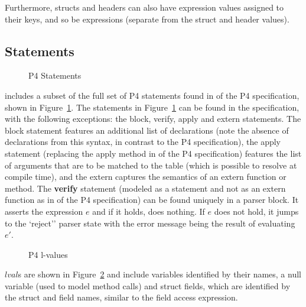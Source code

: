 \documentclass[UTF8]{article}
\begin{document}
Furthermore, structs and headers can also have expression values assigned to their keys, and so be expressions (separate from the struct and header values).

\newcommand{\accept}{``accept''}
\newcommand{\reject}{`reject''}
\subsection{Statements} \label{ssec:stmt}

\begin{figure}[h!]
\centering\ottgrammartabular{
\ottstmt\ottafterlastrule
}
\caption{P4 Statements}
\label{fig:stmt}
\end{figure}

\pfott{} includes a subset of the full set of P4 statements found in  of the P4 specification, shown in Figure~\ref{fig:stmt}. The statements in Figure~\ref{fig:stmt} can be found in the specification, with the following exceptions: the block, verify, apply and extern statements. The block statement features an additional list of declarations (note the absence of declarations from this syntax, in contrast to the P4 specification), the apply statement (replacing the apply method in  of the P4 specification) features the list of arguments that are to be matched to the table \tn{} (which is possible to resolve at compile time), and the extern captures the semantics of an extern function or method. The \textbf{verify} statement (modeled as a statement and not as an extern function as in  of the P4 specification) can be found uniquely in a parser block. It asserts the expression $e$ and if it holds, does nothing. If $e$ does not hold, it jumps to the \reject{} parser state with the error message being the result of evaluating $e'$.

\begin{figure}[h!]
\centering\ottgrammartabular{
\ottlval\ottafterlastrule
}
\caption{P4 l-values}
\label{fig:lval}
\end{figure}

$lval$s are shown in Figure~\ref{fig:lval} and include variables identified by their names, a null variable (used to model method calls) and struct fields, which are identified by the struct and field names, similar to the field access expression.
\end{document}
